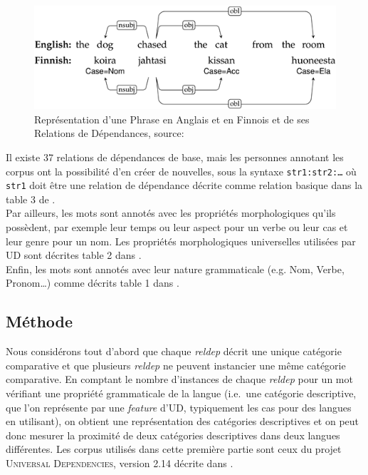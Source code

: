 \documentclass{cours}
\begin{document}
\begin{figure}
	\centering
	\includegraphics[width=\textwidth]{Figures/Visualisations/simplified_ud_annotation}
	\caption{Représentation d'une Phrase en Anglais et en Finnois et de ses Relations de Dépendances, source:\cite{UDv2}}
	\label{fig:ud_annot}
\end{figure}

Il existe 37 relations de dépendances de base, mais les personnes annotant les corpus ont la possibilité d'en créer de nouvelles, sous la syntaxe \texttt{str1:str2:\dots} où \texttt{str1} doit être une relation de dépendance décrite comme relation basique dans la table 3 de \cite{UDv2}.\\
Par ailleurs, les mots sont annotés avec les propriétés morphologiques qu'ils possèdent, par exemple leur temps ou leur aspect pour un verbe ou leur cas et leur genre pour un nom.
Les propriétés morphologiques universelles utilisées par UD sont décrites table 2 dans \cite{UDv2}.\\
Enfin, les mots sont annotés avec leur nature grammaticale (e.g. Nom, Verbe, Pronom\dots) comme décrits table 1 dans \cite{UDv2}.

\subsection{Méthode}\label{subsec:méthode}
Nous considérons tout d'abord que chaque \textit{reldep} décrit une unique catégorie comparative et que plusieurs \textit{reldep} ne peuvent instancier une même catégorie comparative.
En comptant le nombre d'instances de chaque \textit{reldep} pour un mot vérifiant une propriété grammaticale de la langue (i.e.\ une catégorie descriptive, que l'on représente par une \textit{feature} d'UD, typiquement les cas pour des langues en utilisant), on obtient une représentation des catégories descriptives et on peut donc mesurer la proximité de deux catégories descriptives dans deux langues différentes.
Les corpus utilisés dans cette première partie sont ceux du projet \textsc{Universal Dependencies}, version 2.14 décrite dans \cite{UD214}.
\end{document}
